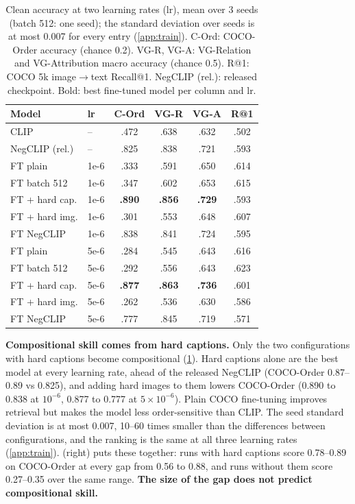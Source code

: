 \documentclass{article}
\begin{document}
\begin{table}[t]
\caption{Clean accuracy at two learning rates (lr), mean over 3 seeds (batch 512: one seed); the standard deviation over seeds is at most 0.007 for every entry (\cref{app:train}). C-Ord: COCO-Order accuracy (chance 0.2). VG-R, VG-A: VG-Relation and VG-Attribution macro accuracy (chance 0.5). R@1: COCO 5k image$\to$text Recall@1. NegCLIP (rel.): released checkpoint. Bold: best fine-tuned model per column and lr.}
\label{tab:matched}
\begin{center}
\begin{small}
\setlength{\tabcolsep}{5pt}\renewcommand{\arraystretch}{1.1}
\begin{tabular}{llcccc}
\toprule
Model & lr & C-Ord & VG-R & VG-A & R@1 \\
\midrule
CLIP & -- & .472 & .638 & .632 & .502 \\
NegCLIP (rel.) & -- & .825 & .838 & .721 & .593 \\
\midrule
FT plain & 1e-6 & .333 & .591 & .650 & .614 \\
FT batch 512 & 1e-6 & .347 & .602 & .653 & .615 \\
FT + hard cap. & 1e-6 & \textbf{.890} & \textbf{.856} & \textbf{.729} & .593 \\
FT + hard img. & 1e-6 & .301 & .553 & .648 & .607 \\
FT NegCLIP & 1e-6 & .838 & .841 & .724 & .595 \\
\midrule
FT plain & 5e-6 & .284 & .545 & .643 & .616 \\
FT batch 512 & 5e-6 & .292 & .556 & .643 & .623 \\
FT + hard cap. & 5e-6 & \textbf{.877} & \textbf{.863} & \textbf{.736} & .601 \\
FT + hard img. & 5e-6 & .262 & .536 & .630 & .586 \\
FT NegCLIP & 5e-6 & .777 & .845 & .719 & .571 \\
\bottomrule
\end{tabular}
\end{small}
\end{center}
\vskip -0.2in
\end{table}

\textbf{Compositional skill comes from hard captions.}
Only the two configurations with hard captions become compositional (\cref{tab:matched}). Hard captions alone are the best model at every learning rate, ahead of the released NegCLIP (COCO-Order 0.87--0.89 vs 0.825), and adding hard images to them lowers COCO-Order (0.890 to 0.838 at $10^{-6}$, 0.877 to 0.777 at $5{\times}10^{-6}$). Plain COCO fine-tuning improves retrieval but makes the model less order-sensitive than CLIP. The seed standard deviation is at most 0.007, 10--60 times smaller than the differences between configurations, and the ranking is the same at all three learning rates (\cref{app:train}).  (right) puts these together: runs with hard captions score 0.78--0.89 on COCO-Order at every gap from 0.56 to 0.88, and runs without them score 0.27--0.35 over the same range. \textbf{The size of the gap does not predict compositional skill.}
\end{document}
